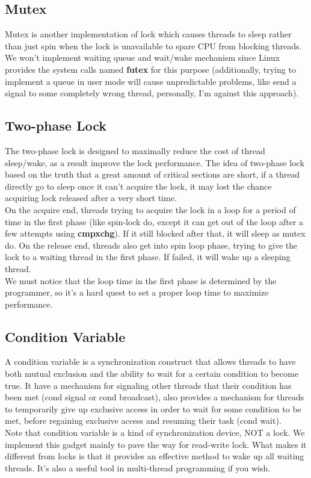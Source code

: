 \documentclass{article}
\begin{document}
\subsection{Mutex}
Mutex is another implementation of lock which causes threads to sleep rather than just spin when the lock is unavailable to spare CPU from blocking threads. We won't implement waiting queue and wait/wake mechanism since Linux provides the system calls named \textbf{futex} for this purpose (additionally, trying to implement a queue in user mode will cause unpredictable problems, like send a signal to some completely wrong thread, personally, I'm against this approach).

\subsection{Two-phase Lock}
The two-phase lock is designed to maximally reduce the cost of thread sleep/wake, as a result improve the lock performance. The idea of two-phase lock based on the truth that a great amount of critical sections are short, if a thread directly go to sleep once it can't acquire the lock, it may lost the chance acquiring lock released after a very short time.\\
On the acquire end, threads trying to acquire the lock in a loop for a period of time in the first phase (like spin-lock do, except it can get out of the loop after a few attempts using \textbf{cmpxchg}). If it still blocked after that, it will sleep as mutex do. On the release end, threads also get into spin loop phase, trying to give the lock to a waiting thread in the first phase. If failed, it will wake up a sleeping thread.\\
We must notice that the loop time in the first phase is determined by the programmer, so it's a hard quest to set a proper loop time to maximize performance.

\subsection{Condition Variable}
A condition variable is a synchronization construct that allows threads to have both mutual exclusion and the ability to wait for a certain condition to become true. It have a mechanism for signaling other threads that their condition has been met (cond signal or cond broadcast), also provides a mechanism for threads to temporarily give up exclusive access in order to wait for some condition to be met, before regaining exclusive access and resuming their task (cond wait).\\
Note that condition variable is a kind of synchronization device, NOT a lock. We implement this gadget mainly to pave the way for read-write lock. What makes it different from locks is that it provides an effective method to wake up all waiting threads. It's also a useful tool in multi-thread programming if you wish.
\end{document}
